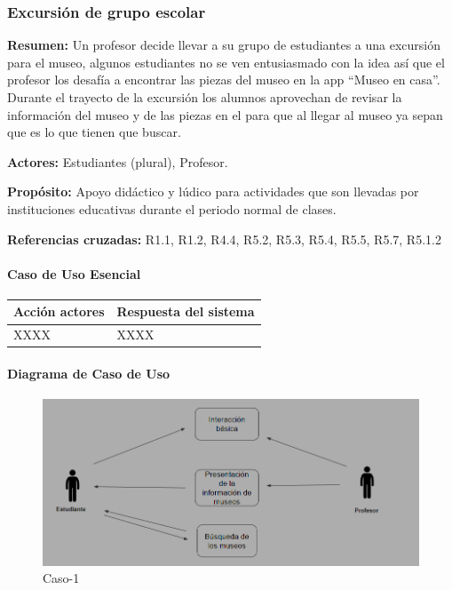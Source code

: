\subsubsection{Excursión de grupo escolar}

{\textbf {Resumen:}}
Un profesor decide llevar a su grupo de estudiantes a una excursión para el museo, algunos estudiantes no se ven entusiasmado con la idea así que el profesor los desafía a encontrar las piezas del museo en la app “Museo en casa”. Durante el trayecto de la excursión los alumnos aprovechan de revisar la información del museo y de las piezas en el para que al llegar al museo ya sepan que es lo que tienen que buscar.

{\textbf {Actores:}}
Estudiantes (plural), Profesor.

{\textbf {Propósito:}}
Apoyo didáctico y lúdico para actividades que son llevadas por instituciones educativas durante el periodo normal de clases.

{\textbf {Referencias cruzadas:}}
R1.1, R1.2, R4.4, R5.2, R5.3, R5.4, R5.5, R5.7, R5.1.2

\paragraph{Caso de Uso Esencial}

\begin{longtable}{|p{5cm}|p{8cm}|}
\hline 
Acción actores & Respuesta del sistema \\ 
\hline 
XXXX & XXXX \\ 
\hline 
\end{longtable}

\paragraph{Diagrama de Caso de Uso}

\begin{figure}[H]
\centerline{\includegraphics[width=15cm]{imgs/CasoUso_5.PNG}}
\caption{Caso-1}
\label{fig}
\end{figure}

